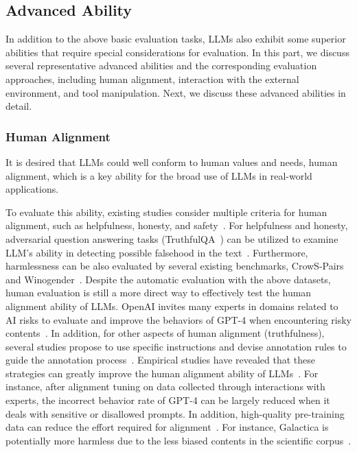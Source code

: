 \subsection{Advanced Ability}\label{sec:superior}
{In addition to the above basic evaluation tasks, LLMs also exhibit some superior abilities that require special considerations for evaluation.  
In this part, we discuss several representative advanced  abilities and the corresponding evaluation approaches, including human alignment, interaction with the external environment, and tool manipulation. %
Next, we discuss these advanced abilities in detail. 
}%



\subsubsection{Human Alignment}
It is desired that LLMs could  well conform to human values and needs, \ie human alignment, which is a key ability  for the broad use of LLMs in real-world applications. %


To evaluate this ability, existing studies consider multiple criteria for human alignment, such as helpfulness, honesty, and safety~\cite{Askell-arxiv-2021-A,OpenAI-OpenAI-2023-GPT-4,Bai-arxiv-2022-Training}.
For helpfulness and honesty,  adversarial question answering tasks (\eg TruthfulQA~\cite{Lin-ACL-2022-TruthfulQA})  can be utilized to examine LLM's ability in detecting possible falsehood in the text~\cite{Nakano-arxiv-2021-WebGPT,OpenAI-OpenAI-2023-GPT-4}. 
Furthermore, harmlessness can  be also evaluated by several existing benchmarks, \eg CrowS-Pairs~\cite{Nangia-EMNLP-2020-CrowS} and  Winogender~\cite{Rudinger-NAACL-2018-Gender}.
Despite the automatic evaluation with the above datasets, human evaluation is still a more direct way to effectively test the human alignment ability of LLMs.
{OpenAI invites  many experts in domains related to AI risks to evaluate and improve the behaviors of GPT-4 when encountering risky contents~\cite{OpenAI-OpenAI-2023-GPT-4}.
}
In addition, for other aspects of human alignment (\eg truthfulness),  several studies propose to use  specific instructions and devise annotation rules to guide the annotation process~\cite{Nakano-arxiv-2021-WebGPT}. 
Empirical studies have revealed that these strategies can greatly improve the human alignment ability of LLMs~\cite{Bai-arxiv-2022-Training}.  %
{For instance, after alignment tuning on data collected through interactions with experts, the incorrect behavior rate of GPT-4 can be largely reduced  when it deals with sensitive or disallowed prompts. } 
{In addition, high-quality pre-training data can reduce the effort required for alignment~\cite{OpenAI-OpenAI-2023-GPT-4}.} 
For instance, Galactica is potentially more  harmless due to the less biased contents in the scientific corpus~\cite{Taylor-arxiv-2022-Galactica}.


